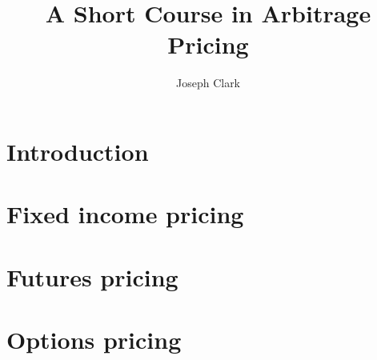 \documentclass[a4paper,fleqn]{book}
\begin{document}
\frontmatter

\title{A Short Course in Arbitrage Pricing}
\author{Joseph Clark}

\maketitle

%

\setlength{\parskip}{0ex plus 0.5ex minus 0.2ex}
\tableofcontents

\setlength{\parskip}{1.3ex plus 0.2ex minus 0.2ex}

\mainmatter
\fancyhead[LO]{\leftmark}

\chapter{Introduction}

\chapter{Fixed income pricing}

\chapter{Futures pricing}

\chapter{Options pricing}


\newpage
\pagestyle{plain}


\newpage
\end{document}
